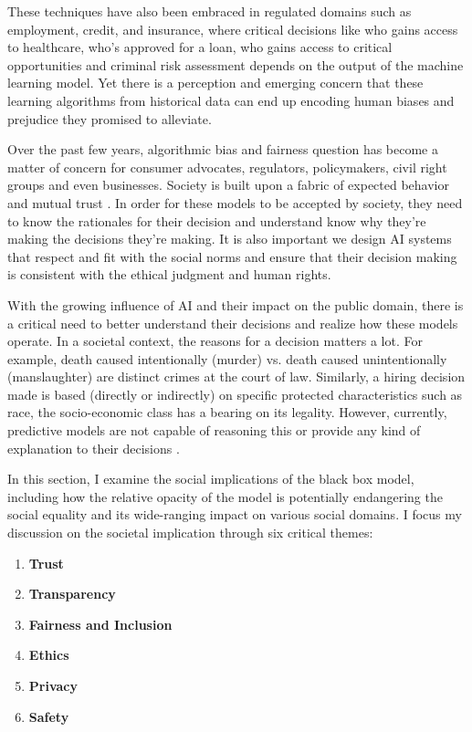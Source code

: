 These techniques have also been embraced in regulated domains such as employment, credit, and insurance, where critical decisions like who gains access to healthcare, who’s approved for a loan, who gains access to critical opportunities and criminal risk assessment \cite{ainow2018} depends on the output of the machine learning model. Yet there is a perception and emerging concern that these learning algorithms from historical data can end up encoding human biases and prejudice they promised to alleviate.

Over the past few years, algorithmic bias and fairness question has become a matter of concern for consumer advocates, regulators, policymakers, civil right groups and even businesses. Society is built upon a fabric of expected behavior and mutual trust \cite{Lipton2018}. In order for these models to be accepted by society, they need to know the rationales for their decision and understand know why they’re making the decisions they’re making. It is also important we design AI systems that respect and fit with the social norms and ensure that their decision making is consistent with the ethical judgment and human rights.

With the growing influence of AI and their impact on the public domain, there is a critical need to better understand their decisions and realize how these models operate.  In a societal context, the reasons for a decision matters a lot. For example, death caused intentionally (murder) vs. death caused unintentionally (manslaughter) are distinct crimes at the court of law. Similarly, a hiring decision made is based (directly or indirectly) on specific protected characteristics such as race, the socio-economic class has a bearing on its legality. However, currently, predictive models are not capable of reasoning this or provide any kind of explanation to their decisions \cite{molnar}.

In this section, I examine the social implications of the black box model, including how the relative opacity of the model is potentially endangering the social equality and its wide-ranging impact on various social domains. I focus my discussion on the societal implication through six critical themes:

\begin{enumerate}
\item \textbf{Trust}
\item  \textbf{Transparency}
\item \textbf{Fairness and Inclusion}
\item \textbf{Ethics}
\item \textbf{Privacy}
\item \textbf{Safety}
\end{enumerate}

